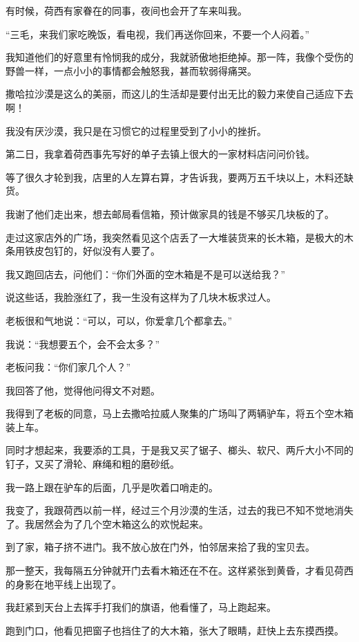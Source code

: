\par 有时候，荷西有家眷在的同事，夜间也会开了车来叫我。
\par “三毛，来我们家吃晚饭，看电视，我们再送你回来，不要一个人闷着。”
\par 我知道他们的好意里有怜悯我的成分，我就骄傲地拒绝掉。那一阵，我像个受伤的野兽一样，一点小小的事情都会触怒我，甚而软弱得痛哭。
\par 撒哈拉沙漠是这么的美丽，而这儿的生活却是要付出无比的毅力来使自己适应下去啊！
\par 我没有厌沙漠，我只是在习惯它的过程里受到了小小的挫折。
\par 第二日，我拿着荷西事先写好的单子去镇上很大的一家材料店问问价钱。
\par 等了很久才轮到我，店里的人左算右算，才告诉我，要两万五千块以上，木料还缺货。
\par 我谢了他们走出来，想去邮局看信箱，预计做家具的钱是不够买几块板的了。
\par 走过这家店外的广场，我突然看见这个店丢了一大堆装货来的长木箱，是极大的木条用铁皮包钉的，好似没有人要了。
\par 我又跑回店去，问他们：“你们外面的空木箱是不是可以送给我？”
\par 说这些话，我脸涨红了，我一生没有这样为了几块木板求过人。
\par 老板很和气地说：“可以，可以，你爱拿几个都拿去。”
\par 我说：“我想要五个，会不会太多？”
\par 老板问我：“你们家几个人？”
\par 我回答了他，觉得他问得文不对题。
\par 我得到了老板的同意，马上去撒哈拉威人聚集的广场叫了两辆驴车，将五个空木箱装上车。
\par 同时才想起来，我要添的工具，于是我又买了锯子、榔头、软尺、两斤大小不同的钉子，又买了滑轮、麻绳和粗的磨砂纸。
\par 我一路上跟在驴车的后面，几乎是吹着口哨走的。
\par 我变了，我跟荷西以前一样，经过三个月沙漠的生活，过去的我已不知不觉地消失了。我居然会为了几个空木箱这么的欢悦起来。
\par 到了家，箱子挤不进门。我不放心放在门外，怕邻居来拾了我的宝贝去。
\par 那一整天，我每隔五分钟就开门去看木箱还在不在。这样紧张到黄昏，才看见荷西的身影在地平线上出现了。
\par 我赶紧到天台上去挥手打我们的旗语，他看懂了，马上跑起来。
\par 跑到门口，他看见把窗子也挡住了的大木箱，张大了眼睛，赶快上去东摸西摸。
